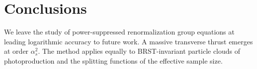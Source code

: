 \section{Conclusions}\label{sec:conclusions}

We leave the study of power-suppressed renormalization group equations
at leading logarithmic accuracy to future work. A massive transverse
thrust emerges at order $\alpha_s^2$. The method applies equally to
BRST-invariant particle clouds of photoproduction and the splitting
functions of the effective sample size.

